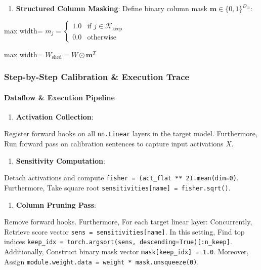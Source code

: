 \begin{enumerate}
\item \textbf{Structured Column Masking}:
Define binary column mask $\mathbf{m} \in \{0, 1\}^{D_{\text{in}}}$:
\end{enumerate}
\begin{center}
\begin{adjustbox}{max width=\columnwidth}
$\displaystyle
m_j = \begin{cases} 1.0 & \text{if } j \in \mathcal{K}_{\text{keep}} \\ 0.0 & \text{otherwise} \end{cases}
$
\end{adjustbox}
\end{center}
\begin{center}
\begin{adjustbox}{max width=\columnwidth}
$\displaystyle
W_{\text{shed}} = W \odot \mathbf{m}^T
$
\end{adjustbox}
\end{center}


\subsubsection*{Step-by-Step Calibration \& Execution Trace}

\paragraph{Dataflow \& Execution Pipeline}

\begin{enumerate}
\item \textbf{Activation Collection}:
\end{enumerate}
Register forward hooks on all \texttt{nn.Linear} layers in the target model. Furthermore, Run forward pass on calibration sentences to capture input activations $X$.

\begin{enumerate}
\item \textbf{Sensitivity Computation}:
\end{enumerate}
Detach activations and compute \texttt{fisher = (act\_flat ** 2).mean(dim=0)}. Furthermore, Take square root \texttt{sensitivities[name] = fisher.sqrt()}.

\begin{enumerate}
\item \textbf{Column Pruning Pass}:
\end{enumerate}
Remove forward hooks. Furthermore, For each target linear layer: Concurrently, Retrieve score vector \texttt{sens = sensitivities[name]}. In this setting, Find top indices \texttt{keep\_idx = torch.argsort(sens, descending=True)[:n\_keep]}. Additionally, Construct binary mask vector \texttt{mask[keep\_idx] = 1.0}. Moreover, Assign \texttt{module.weight.data = weight * mask.unsqueeze(0)}.



